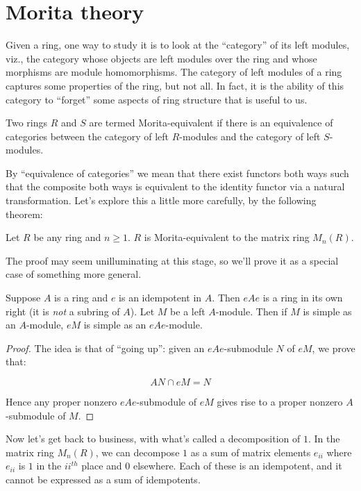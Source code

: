 \documentclass[a4paper]{amsart}
\begin{document}
\section{Morita theory}

Given a ring, one way to study it is to look at the ``category'' of
its left modules, viz., the category whose objects are left modules
over the ring and whose morphisms are module homomorphisms. The
category of left modules of a ring captures some properties of the
ring, but not all. In fact, it is the ability of this category to
``forget'' some aspects of ring structure that is useful to us.

\begin{definer}
  Two rings $R$ and $S$ are termed Morita-equivalent if there is an
  equivalence of categories between the category of left $R$-modules
  and the category of left $S$-modules.
\end{definer}

By ``equivalence of categories'' we mean that there exist functors
both ways such that the composite both ways is equivalent to the
identity functor via a natural transformation. Let's explore this a
little more carefully, by the following theorem:

\begin{theorem}
  Let $R$ be any ring and $n \ge 1$. $R$ is Morita-equivalent to the
  matrix ring $M_n(R)$.
\end{theorem}

The proof may seem unilluminating at this stage, so we'll prove it as
a special case of something more general.

\begin{theorem}
  Suppose $A$ is a ring and $e$ is an idempotent in $A$. Then $eAe$ is
  a ring in its own right (it is {\em not} a subring of $A$). Let $M$
  be a left $A$-module. Then if $M$ is simple as an $A$-module, $eM$
  is simple as an $eAe$-module.
\end{theorem}

\begin{proof}
  The idea is that of ``going up'': given an $eAe$-submodule $N$ of $eM$,
  we prove that:

  $$AN \cap eM = N$$

  Hence any proper nonzero $eAe$-submodule of $eM$ gives rise to a
  proper nonzero $A$-submodule of $M$.
\end{proof}

Now let's get back to business, with what's called a decomposition of
$1$. In the matrix ring $M_n(R)$, we can decompose $1$ as a sum of
matrix elements $e_{ii}$ where $e_{ii}$ is $1$ in the $ii^{th}$ place
and $0$ elsewhere. Each of these is an idempotent, and it cannot be
expressed as a sum of idempotents.
\end{document}
